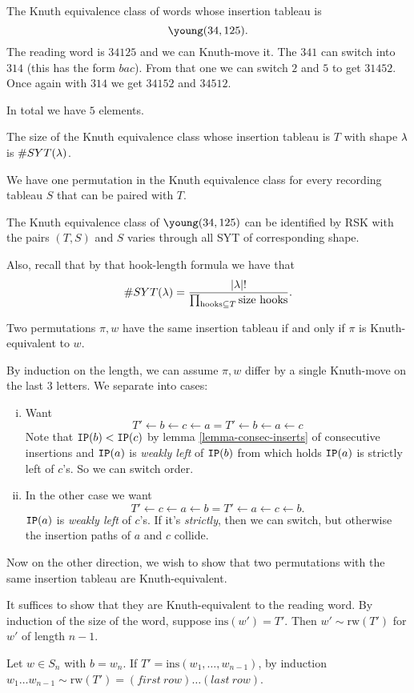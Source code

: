 \documentclass[12pt]{memoir}
\begin{document}
\begin{Ex}
    The Knuth equivalence class of words whose insertion tableau is 
    $$\young(34,125).$$
    The reading word is $34125$ and we can Knuth-move it. The $341$ can switch into $314$ (this has the form $bac$). From that one we can switch $2$ and $5$ to get $31452$. Once again with $314$ we get $34152$ and $34512$.\par 
    In total we have $5$ elements.
\end{Ex}

\begin{Prop}
    The size of the Knuth equivalence class whose insertion tableau is $T$ with shape $\lambda$ is $\#SYT(\lambda)$.
\end{Prop}

\begin{ptcbp}
    We have one permutation in the Knuth equivalence class for every recording tableau $S$ that can be paired with $T$.
\end{ptcbp}

The Knuth equivalence class of $\young(34,125)$ can be identified by RSK with the pairs $(T,S)$ and $S$ varies through all SYT of corresponding shape.\par
Also, recall that by that hook-length formula we have that 
$$\#SYT(\lambda)=\frac{|\lambda|!}{\prod_{\text{hooks}\subseteq T} \text{size hooks}}.$$

\begin{Th}
    Two permutations $\pi, w$ have the same insertion tableau if and only if $\pi$ is Knuth-equivalent to $w$.
\end{Th}
\begin{ptcbp}
By induction on the length, we can assume $\pi, w$ differ by a single Knuth-move on the last $3$ letters. We separate into cases:
\begin{enumerate}[i)]
    \itemsep=-0.4em
    \item Want 
    $$T'\leftarrow b\leftarrow c\leftarrow a=T'\leftarrow b\leftarrow a\leftarrow c$$
    Note that $\texttt{IP}(b)<\texttt{IP}(c)$ by lemma \ref{lemma-consec-inserts} of consecutive insertions and $\texttt{IP}(a)$ is \emph{weakly left} of $\texttt{IP}(b)$ from which holds $\texttt{IP}(a)$ is strictly left of $c$'s. So we can switch order.
    \item In the other case  we want
    $$T'\leftarrow c\leftarrow a\leftarrow b=T'\leftarrow a\leftarrow c\leftarrow b.$$
    $\texttt{IP}(a)$ is \emph{weakly left} of $c$'s. If it's \emph{strictly}, then we can switch, but otherwise the insertion paths of $a$ and $c$ collide. 
\end{enumerate}
Now on the other direction, we wish to show that two permutations with the same insertion tableau are Knuth-equivalent.\par 
It suffices to show that they are Knuth-equivalent to the reading word. By induction of the size of the word, suppose $\text{ins}(w')=T'$. Then $w'\sim\text{rw}(T')$ for $w'$ of length $n-1$.\par 
Let $w\in S_n$ with $b=w_n$. If $T'=\text{ins}(w_1,\dots,w_{n-1})$, by induction $w_1\dots w_{n-1}\sim\text{rw}(T')=(first\ row)\dots(last\ row)$. 
\end{ptcbp}
\end{document}
